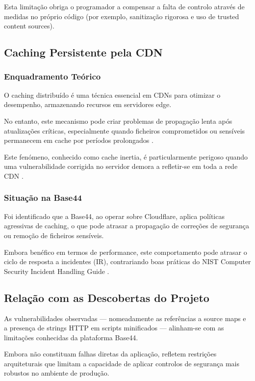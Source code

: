 Esta limitação obriga o programador a compensar a falta de controlo através de medidas no próprio código (por exemplo, sanitização rigorosa e uso de trusted content sources).

\subsection{Caching Persistente pela CDN}

\subsubsection{Enquadramento Teórico}

O caching distribuído é uma técnica essencial em CDNs para otimizar o desempenho, armazenando recursos em servidores edge.

No entanto, este mecanismo pode criar problemas de propagação lenta após atualizações críticas, especialmente quando ficheiros comprometidos ou sensíveis permanecem em cache por períodos prolongados \cite{ref26}.

Este fenómeno, conhecido como cache inertia, é particularmente perigoso quando uma vulnerabilidade corrigida no servidor demora a refletir-se em toda a rede CDN \cite{ref27}.

\subsubsection{Situação na Base44}

Foi identificado que a Base44, ao operar sobre Cloudflare, aplica políticas agressivas de caching, o que pode atrasar a propagação de correções de segurança ou remoção de ficheiros sensíveis.

Embora benéfico em termos de performance, este comportamento pode atrasar o ciclo de resposta a incidentes (IR), contrariando boas práticas do NIST Computer Security Incident Handling Guide \cite{ref28}.

\subsection{Relação com as Descobertas do Projeto}

As vulnerabilidades observadas — nomeadamente as referências a source maps e a presença de strings HTTP em scripts minificados — alinham-se com as limitações conhecidas da plataforma Base44.

Embora não constituam falhas diretas da aplicação, refletem restrições arquiteturais que limitam a capacidade de aplicar controlos de segurança mais robustos no ambiente de produção.

